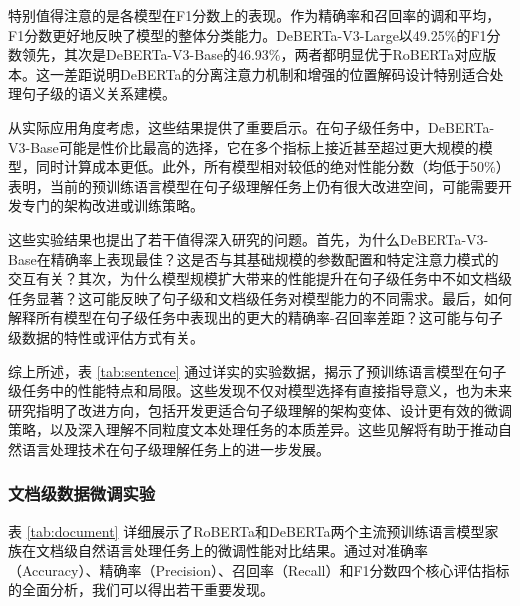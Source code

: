 特别值得注意的是各模型在F1分数上的表现。作为精确率和召回率的调和平均，F1分数更好地反映了模型的整体分类能力。DeBERTa-V3-Large以49.25\%的F1分数领先，其次是DeBERTa-V3-Base的46.93\%，两者都明显优于RoBERTa对应版本。这一差距说明DeBERTa的分离注意力机制和增强的位置解码设计特别适合处理句子级的语义关系建模。

从实际应用角度考虑，这些结果提供了重要启示。在句子级任务中，DeBERTa-V3-Base可能是性价比最高的选择，它在多个指标上接近甚至超过更大规模的模型，同时计算成本更低。此外，所有模型相对较低的绝对性能分数（均低于50\%）表明，当前的预训练语言模型在句子级理解任务上仍有很大改进空间，可能需要开发专门的架构改进或训练策略。

这些实验结果也提出了若干值得深入研究的问题。首先，为什么DeBERTa-V3-Base在精确率上表现最佳？这是否与其基础规模的参数配置和特定注意力模式的交互有关？其次，为什么模型规模扩大带来的性能提升在句子级任务中不如文档级任务显著？这可能反映了句子级和文档级任务对模型能力的不同需求。最后，如何解释所有模型在句子级任务中表现出的更大的精确率-召回率差距？这可能与句子级数据的特性或评估方式有关。

综上所述，表 \ref{tab:sentence} 通过详实的实验数据，揭示了预训练语言模型在句子级任务中的性能特点和局限。这些发现不仅对模型选择有直接指导意义，也为未来研究指明了改进方向，包括开发更适合句子级理解的架构变体、设计更有效的微调策略，以及深入理解不同粒度文本处理任务的本质差异。这些见解将有助于推动自然语言处理技术在句子级理解任务上的进一步发展。

\subsubsection{文档级数据微调实验}

表 \ref{tab:document} 详细展示了RoBERTa和DeBERTa两个主流预训练语言模型家族在文档级自然语言处理任务上的微调性能对比结果。通过对准确率（Accuracy）、精确率（Precision）、召回率（Recall）和F1分数四个核心评估指标的全面分析，我们可以得出若干重要发现。

